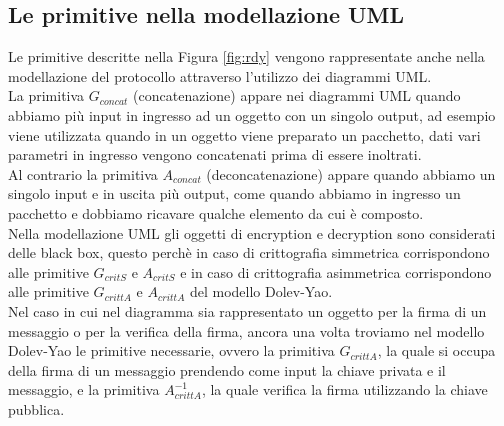 \subsection{Le primitive nella modellazione UML}

Le primitive descritte nella Figura \ref*{fig:rdy} vengono rappresentate anche nella modellazione del protocollo attraverso l'utilizzo dei diagrammi UML.\\
La primitiva $G_{concat}$ (concatenazione) appare nei diagrammi UML quando abbiamo più input in ingresso ad un oggetto con un singolo output, ad esempio viene utilizzata quando in un oggetto viene preparato un pacchetto, dati vari parametri in ingresso vengono concatenati prima di essere inoltrati.\\
Al contrario la primitiva $A_{concat}$ (deconcatenazione) appare quando abbiamo un singolo input e in uscita più output, come quando abbiamo in ingresso un pacchetto e dobbiamo ricavare qualche elemento da cui è composto.\\
Nella modellazione UML gli oggetti di encryption e decryption sono considerati delle black box, questo perchè in caso di crittografia simmetrica corrispondono alle primitive $G_{critS}$ e $A_{critS}$ e in caso di crittografia asimmetrica corrispondono alle primitive $G_{crittA}$ e $A_{crittA}$ del modello Dolev-Yao.\\
Nel caso in cui nel diagramma sia rappresentato un oggetto per la firma di un messaggio o per la verifica della firma, ancora una volta troviamo nel modello Dolev-Yao le primitive necessarie, ovvero la primitiva  $G_{crittA}$, la quale si occupa della firma di un messaggio prendendo come input la chiave privata e il messaggio, e la primitiva $A^{-1}_{crittA}$, la quale verifica la firma utilizzando la chiave pubblica.




